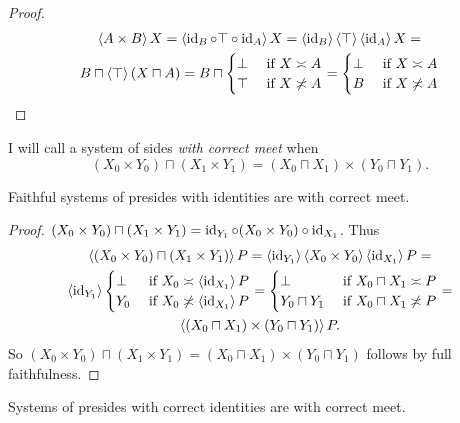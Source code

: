 \begin{proof}
~
\begin{multline*}
\left\langle A\times B\right\rangle X = \left\langle \operatorname{id}_B\circ\top\circ\operatorname{id}_A\right\rangle X =
\left\langle \operatorname{id}_B\right\rangle\left\langle \top\right\rangle\left\langle \operatorname{id}_A\right\rangle X = \\
B\sqcap\left\langle \top\right\rangle(X\sqcap A) =
B\sqcap\begin{cases}\bot&\text{ if }X\asymp A\\\top&\text{ if }X\not\asymp A\end{cases} =
\begin{cases}\bot&\text{ if }X\asymp A\\B&\text{ if }X\not\asymp A\end{cases}
\end{multline*}
\end{proof}

\begin{defn}
I will call a system of sides \emph{with correct meet} when
\[ (X_0\times Y_0)\sqcap(X_1\times Y_1) = (X_0\sqcap X_1)\times(Y_0\sqcap Y_1). \]
\end{defn}

\begin{prop}
Faithful systems of presides with identities are with correct meet.
\end{prop}

\begin{proof}
$(X_0\times Y_0)\sqcap(X_1\times Y_1) = \operatorname{id}_{Y_1}\circ(X_0\times Y_0)\circ\operatorname{id}_{X_1}$.
Thus
\begin{multline*}
\left\langle (X_0\times Y_0)\sqcap(X_1\times Y_1)\right\rangle P = \left\langle \operatorname{id}_{Y_1}\right\rangle\left\langle X_0\times Y_0\right\rangle\left\langle \operatorname{id}_{X_1}\right\rangle P = \\
\left\langle \operatorname{id}_{Y_1}\right\rangle\begin{cases}\bot&\text{ if }X_0\asymp\left\langle \operatorname{id}_{X_1}\right\rangle P\\Y_0&\text{ if }X_0\not\asymp\left\langle \operatorname{id}_{X_1}\right\rangle P\end{cases} =
\begin{cases}\bot&\text{ if }X_0\sqcap X_1\asymp P\\Y_0\sqcap Y_1&\text{ if }X_0\sqcap X_1\not\asymp P\end{cases} = \\
\left\langle (X_0\sqcap X_1)\times(Y_0\sqcap Y_1)\right\rangle P.
\end{multline*}
So $(X_0\times Y_0)\sqcap(X_1\times Y_1) = (X_0\sqcap X_1)\times(Y_0\sqcap Y_1)$ follows by full faithfulness.
\end{proof}

\begin{prop}
Systems of presides with correct identities are with correct meet.
\end{prop}

